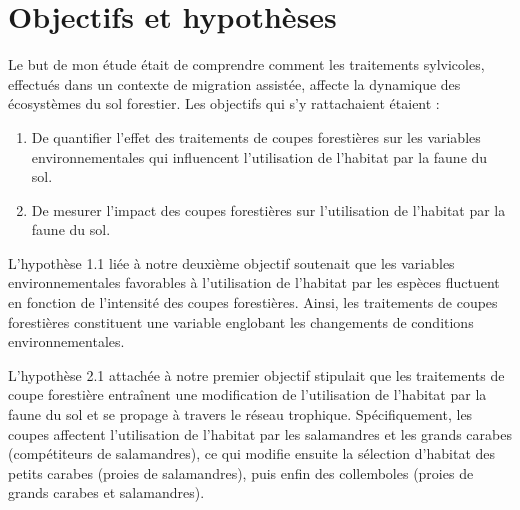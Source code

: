 

\section*{Objectifs et hypothèses}
\label{sec:objectifs}

Le but de mon étude était de comprendre comment les traitements sylvicoles, effectués dans un contexte de migration assistée, 
affecte la dynamique des écosystèmes du sol forestier. Les objectifs qui s’y rattachaient étaient :

\begin{enumerate}
    \item De quantifier l'effet des traitements de coupes forestières sur les variables environnementales qui influencent l'utilisation de l'habitat par la faune du sol.
    \item De mesurer l'impact des coupes forestières sur l'utilisation de l'habitat par la faune du sol.
\end{enumerate}

L'hypothèse 1.1 liée à notre deuxième objectif soutenait que les variables environnementales favorables à l'utilisation de l'habitat par les espèces fluctuent 
en fonction de l'intensité des coupes forestières. Ainsi, les traitements de coupes forestières constituent une variable englobant 
les changements de conditions environnementales.

L'hypothèse 2.1 attachée à notre premier objectif stipulait que les traitements de coupe forestière entraînent une modification de l'utilisation de l'habitat 
par la faune du sol et se propage à travers le réseau trophique. Spécifiquement, les coupes affectent l'utilisation de l'habitat par les salamandres et 
les grands carabes (compétiteurs de salamandres), ce qui modifie ensuite la sélection d'habitat des petits carabes (proies de salamandres), puis enfin des collemboles (proies de grands carabes et salamandres).



\cleardoublepage



